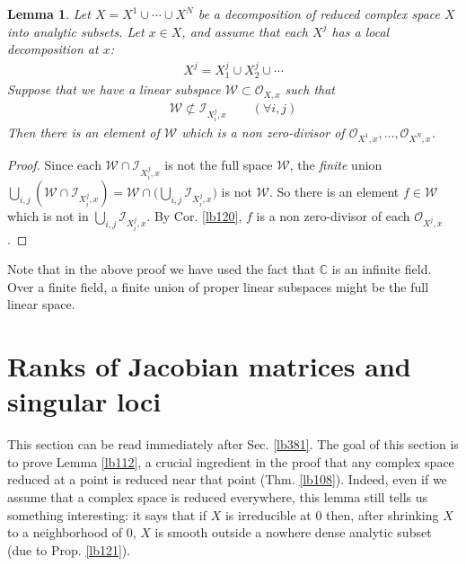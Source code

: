 \documentclass[12pt,b5paper,notitlepage]{report}
\theoremstyle{definition}
\theoremstyle{plain}
\newtheorem{lm}[df]{Lemma}
\newcommand{\scr}{\mathscr}
\newcommand{\Cbb}{\mathbb C}
\numberwithin{equation}{section}
\begin{document}
\begin{lm}\label{lb145}
Let $X=X^1\cup\cdots\cup X^N$ be a decomposition of reduced complex space $X$ into analytic subsets. Let $x\in X$, and assume that each $X^j$ has a local decomposition at $x$:
\begin{align*}
X^j=X^j_1\cup X^j_2\cup\cdots
\end{align*}
Suppose that we have a linear subspace $\scr W\subset\scr O_{X,x}$ such that
\begin{align*}
\scr W\nsubset \scr I_{X^j_i,x}\qquad (\forall i,j)
\end{align*}
Then there is an element of $\scr W$ which is a non zero-divisor of $\scr O_{X^1,x},\dots,\scr O_{X^N,x}$.
\end{lm}

\begin{proof}
Since each $\scr W\cap \scr I_{X^j_i,x}$ is not the full space $\scr W$, the \emph{finite} union $\bigcup_{i,j} (\scr W\cap\scr I_{X_i^j,x})=\scr W\cap \big(\bigcup_{i,j}\scr I_{X_i^j,x}\big)$ is not $\scr W$. So there is an element $f\in\scr W$ which is not in $\bigcup_{i,j}\scr I_{X_i^j,x}$. By Cor. \ref{lb120}, $f$ is a non zero-divisor of each $\scr O_{X^j,x}$.
\end{proof}

Note that in the above proof we have used the fact that $\Cbb$ is an infinite field. Over a finite field, a finite union of proper linear subspaces might be the full linear space.

























\section{Ranks of Jacobian matrices and singular loci}\label{lb119}



This section can be read immediately after Sec. \ref{lb381}. The goal of this section is to prove Lemma \ref{lb112}, a crucial ingredient in the proof that any complex space reduced at a point is reduced near that point (Thm. \ref{lb108}). Indeed, even if we assume that a complex space is reduced everywhere, this lemma still tells us something interesting: it says that if $X$ is irreducible at $0$ then, after shrinking $X$ to a neighborhood of $0$, $X$ is smooth outside a nowhere dense analytic subset (due to Prop. \ref{lb121}). 
\end{document}
